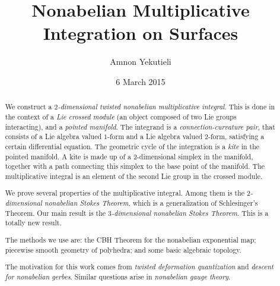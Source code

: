 \documentclass[10pt, a4paper]{amsart}
\author{Amnon Yekutieli}
\title[Nonabelian Multiplicative Integration]{Nonabelian 
Multiplicative Integration on Surfaces}
\date{6 March 2015}
\theoremstyle{definition}
\numberwithin{equation}{section}
\begin{document}
% 
% 
% 
% 

\begin{abstract}
We construct a {\em $2$-dimensional twisted nonabelian multiplicative 
integral}. This is done in the context of a {\em Lie crossed module}
(an object composed of two Lie groups interacting), and a {\em pointed
manifold}. The integrand is a {\em connection-curvature pair}, that consists of
a Lie algebra valued $1$-form and a Lie algebra valued $2$-form, satisfying a
certain differential equation. The geometric cycle of the integration is a {\em
kite} in the pointed manifold. A kite is made up of a $2$-dimensional simplex
in the manifold, together with a path connecting this simplex to the base
point of the manifold. The multiplicative integral is an element of the second
Lie group in the crossed module. 

We prove several properties of the multiplicative integral. Among them is the
{\em $2$-dimensional nonabelian Stokes Theorem}, which is a generalization of
Schlesinger's Theorem. Our main result is the {\em $3$-dimensional nonabelian
Stokes Theorem}. This is a totally new result. 

The methods we use are: the CBH Theorem for the nonabelian exponential map;
piecewise smooth geometry of polyhedra; and some basic algebraic topology. 

The motivation for this work comes from {\em twisted deformation quantization}
and {\em descent for nonabelian gerbes}. 
Similar questions arise in {\em nonabelian gauge theory}.
\end{abstract}
\end{document}
